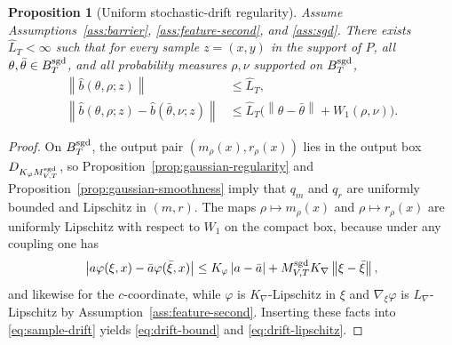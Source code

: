 \documentclass[11pt]{article}
\newtheorem{proposition}[theorem]{Proposition}
\theoremstyle{definition}
\newcommand{\norm}[1]{\left\lVert #1 \right\rVert}
\newcommand{\abs}[1]{\left\lvert #1 \right\rvert}
\begin{document}
\begin{proposition}[Uniform stochastic-drift regularity]
\label{prop:drift-regularity}
Assume Assumptions~\ref{ass:barrier}, \ref{ass:feature-second}, and
\ref{ass:sgd}. There exists $\widehat L_T<\infty$ such that for every sample
$z=(x,y)$ in the support of $P$, all $\theta,\bar\theta\in B_T^{\rm sgd}$, and
all probability measures $\rho,\nu$ supported on $B_T^{\rm sgd}$,
\begin{align}
  \norm{\hat b(\theta,\rho;z)}
  &\le
  \widehat L_T,
  \label{eq:drift-bound}
  \\
  \norm{\hat b(\theta,\rho;z)-\hat b(\bar\theta,\nu;z)}
  &\le
  \widehat L_T\bigl(\norm{\theta-\bar\theta}+W_1(\rho,\nu)\bigr).
  \label{eq:drift-lipschitz}
\end{align}
\end{proposition}

\begin{proof}
On $B_T^{\rm sgd}$, the output pair $(m_\rho(x),r_\rho(x))$ lies in the output box
$D_{K_\varphi M_{V,T}^{\rm sgd}}$, so Proposition~\ref{prop:gaussian-regularity} and
Proposition~\ref{prop:gaussian-smoothness} imply that $q_m$ and $q_r$ are
uniformly bounded and Lipschitz in $(m,r)$. The maps
$\rho\mapsto m_\rho(x)$ and $\rho\mapsto r_\rho(x)$ are uniformly Lipschitz
with respect to $W_1$ on the compact box, because under any coupling one has
\[
  \abs{a\varphi(\xi,x)-\bar a\varphi(\bar\xi,x)}
  \le
  K_\varphi\abs{a-\bar a}
  +
  M_{V,T}^{\rm sgd}K_\nabla\norm{\xi-\bar\xi},
\]
and likewise for the $c$-coordinate, while
$\varphi$ is $K_\nabla$-Lipschitz in $\xi$ and $\nabla_\xi\varphi$ is
$L_\nabla$-Lipschitz by Assumption~\ref{ass:feature-second}. Inserting these
facts into \eqref{eq:sample-drift} yields \eqref{eq:drift-bound} and
\eqref{eq:drift-lipschitz}.
\end{proof}
\end{document}
